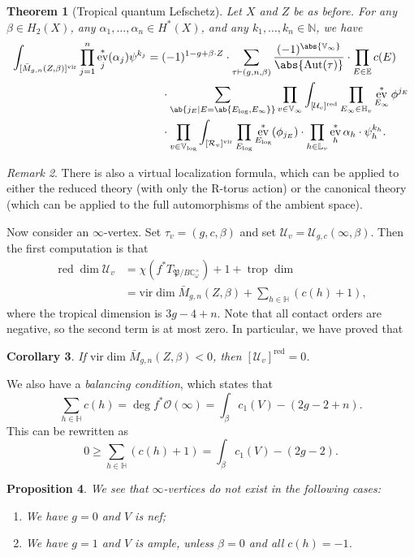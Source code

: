 \documentclass{amsart}
\newtheorem{thm}{Theorem}[section]
\newtheorem{cor}[thm]{Corollary}
\newtheorem{prop}[thm]{Proposition}
\theoremstyle{definition}
\theoremstyle{remark}
\newtheorem{rmk}[thm]{Remark}
\theoremstyle{plain}
\theoremstyle{definition}
\theoremstyle{remark}
\newcommand{\N}{\mathbb{N}}
\newcommand{\C}{\mathbb{C}}
\newcommand{\E}{\mathbb{E}}
\newcommand{\V}{\mathbb{V}}
\renewcommand{\H}{\mathbb{H}}
\renewcommand{\L}{\mathbb{L}}
\newcommand{\mc}[1]{\mathcal{#1}}
\newcommand{\mf}[1]{\mathfrak{#1}}
\newcommand{\mr}[1]{\mathrm{#1}}
\newcommand{\on}[1]{\operatorname{#1}}
\newcommand{\1}{\mathbf{1}}
\newcommand{\2}{\mathbf{2}}
\newcommand{\3}{\mathbf{3}}
\newcommand{\vir}{\mr{vir}}
\DeclareMathOperator{\Aut}{Aut}
\DeclareMathOperator{\ev}{ev}
\begin{document}
\begin{thm}[Tropical quantum Lefschetz]
    Let \(X\) and \(Z\) be as before. For any \(\beta \in H_2(X)\), any \(\alpha_1, \ldots, \alpha_n \in H^*(X)\), and any \(k_1, \ldots, k_n \in \N\), we have
    \begin{align*}
        \int_{[\bar{M}_{g,n}(Z,\beta)]^{\vir}} \prod_{j=1}^n \ev_j^* (\alpha_j) \psi^{k_j}={}& (-1)^{1-g+\beta \cdot Z} \cdot \sum_{\tau \vdash (g,n,\beta)} \frac{(-1)^{\abs{\V_{\infty}}}}{\abs{\Aut(\tau)}} \cdot \prod_{E \in \E} c(E) \\
        & \cdot \sum_{\ab\{j_E \mid E = \ab\{E_{\log}, E_{\infty}\}\}}  \prod_{v \in \V_{\infty}} \int_{[\mc{U}_v]^{\on{red}}} \prod_{E_{\infty} \in \H_v} \ev_{E_{\infty}}^* \phi^{j_E}  \\
        &  \cdot \prod_{v \in \V_{\log}} \int_{[\mc{R}_v]^{\vir}} \prod_{E_{\log}} \ev_{E_{\log}}^* (\phi_{j_E}) \cdot \prod_{h \in \L_v} \ev_h^* \alpha_h \cdot \psi_h^{k_h} .
    \end{align*}
\end{thm}

\begin{rmk}
    There is also a virtual localization formula, which can be applied to either the reduced theory (with only the R-torus action) or the canonical theory (which can be applied to the full automorphisms of the ambient space).
\end{rmk}

Now consider an \(\infty\)-vertex. Set \(\tau_v = (g, c, \beta)\) and set \(\mc{U}_v = \mc{U}_{g,c}(\infty, \beta)\). Then the first computation is that
\begin{align*}
    \on{red}\dim \mc{U}_v &= \chi(f^* T_{\mf{P}/B \C^{\times}_{\omega}}) + 1 + \on{trop}\dim  \\
    &= \vir\dim \bar{M}_{g,n}(Z, \beta) + \sum_{h \in \H } (c(h) + 1),
\end{align*}
where the tropical dimension is \(3g-4+n\). Note that all contact orders are negative, so the second term is at most zero. In particular, we have proved that
\begin{cor}
    If \(\vir\dim \bar{M}_{g,n}(Z,\beta) < 0\), then \([\mc{U}_v]^{\on{red}} = 0\).
\end{cor}
We also have a \textit{balancing condition}, which states that 
\begin{equation}\label{eqn:balancing condition}
    \sum_{h \in \H} c(h) = \deg f^* \mc{O}(\infty) = \int_{\beta} c_1(V) - (2g-2+n).
\end{equation}
This can be rewritten as
\[ 0 \geq \sum_{h \in \H} (c(h)+1) = \int_{\beta} c_1(V) - (2g-2). \]
\begin{prop}
    We see that \(\infty\)-vertices do not exist in the following cases:
    \begin{enumerate}
        \item We have \(g = 0\) and \(V\) is nef;
        \item We have \(g=1\) and \(V\) is ample, unless \(\beta = 0\) and all \(c(h) = -1\).
    \end{enumerate}
\end{prop}
\end{document}
